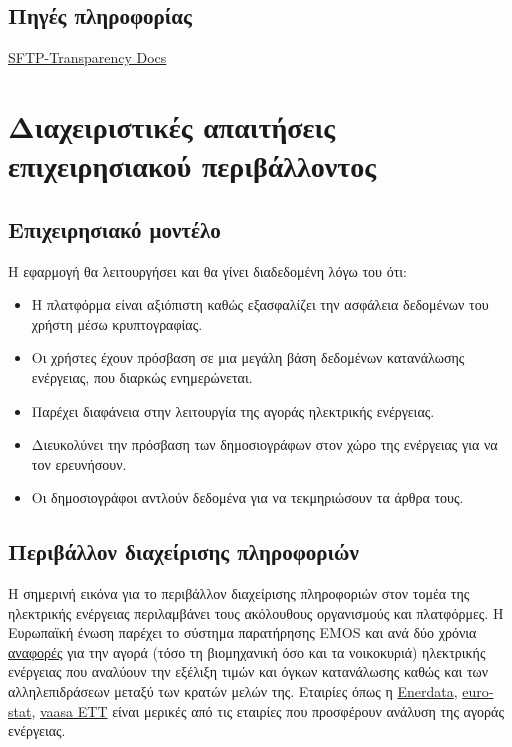 \documentclass[a4paper,12pt, oneside]{article}
\begin{document}
\subsection*{Πηγές πληροφορίας}
\begingroup
\latintext
\sloppy
\begin{enumerate}
\begin{sloppypar}
   \item \href{https://transparency.entsoe.eu/content/static\_content/Static\%20content/knowledge\%20base/SFTP-Transparency\_Docs.html}{SFTP-Transparency Docs}
   \end{sloppypar}
\end{enumerate}
\endgroup
\greektext


\section{Διαχειριστικές απαιτήσεις επιχειρησιακού περιβάλλοντος} 
\subsection{Επιχειρησιακό μοντέλο}
Η εφαρμογή θα λειτουργήσει και θα γίνει διαδεδομένη λόγω του ότι:
\begin{itemize}
  \item Η πλατφόρμα είναι αξιόπιστη καθώς εξασφαλίζει την ασφάλεια δεδομένων του χρήστη μέσω κρυπτογραφίας.
  \item Οι χρήστες έχουν πρόσβαση σε μια μεγάλη βάση δεδομένων κατανάλωσης ενέργειας, που διαρκώς ενημερώνεται.
  \item Παρέχει διαφάνεια στην λειτουργία της αγοράς ηλεκτρικής ενέργειας.
    \item Διευκολύνει την πρόσβαση των δημοσιογράφων στον χώρο της ενέργειας για να τον ερευνήσουν.
    \item Οι δημοσιογράφοι αντλούν δεδομένα για να τεκμηριώσουν τα άρθρα τους. 
\end{itemize}


\subsection{Περιβάλλον διαχείρισης πληροφοριών}
Η σημερινή εικόνα για το περιβάλλον διαχείρισης πληροφοριών  στον τομέα της ηλεκτρικής ενέργειας περιλαμβάνει τους ακόλουθους οργανισμούς και πλατφόρμες. Η Ευρωπαϊκή ένωση παρέχει το σύστημα παρατήρησης \textlatin{EMOS} και ανά δύο χρόνια \href{https://ec.europa.eu/energy/en/data-analysis/market-analysis#gas-and-electricity-market-reports}{αναφορές} για την αγορά (τόσο τη βιομηχανική όσο και τα νοικοκυριά) ηλεκτρικής ενέργειας  που αναλύουν την εξέλιξη τιμών και όγκων κατανάλωσης καθώς και των αλληλεπιδράσεων μεταξύ των κρατών μελών της. Εταιρίες όπως η \href{https://www.enerdata.net}{\textlatin{Enerdata}}, \href{https://ec.europa.eu/eurostat/web/energy}{\textlatin{eurostat}}, \href{http://www.vaasaett.com}{\textlatin{vaasa ETT}} είναι μερικές από τις εταιρίες που προσφέρουν ανάλυση της αγοράς ενέργειας. 
\newpage
\end{document}
